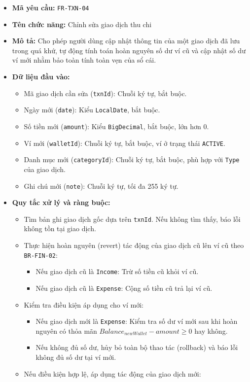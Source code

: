 \documentclass[11pt,a4paper]{article}
\providecommand{\tightlist}{
  \setlength{\itemsep}{0pt}\setlength{\parskip}{0pt}}
\begin{document}
\begin{itemize}
\tightlist
\item
  \textbf{Mã yêu cầu:} \texttt{FR-TXN-04}
\item
  \textbf{Tên chức năng:} Chỉnh sửa giao dịch thu chi
\item
  \textbf{Mô tả:} Cho phép người dùng cập nhật thông tin của một giao
  dịch đã lưu trong quá khứ, tự động tính toán hoàn nguyên số dư ví cũ
  và cập nhật số dư ví mới nhằm bảo toàn tính toàn vẹn của sổ cái.
\item
  \textbf{Dữ liệu đầu vào:}

  \begin{itemize}
  \tightlist
  \item
    Mã giao dịch cần sửa (\texttt{txnId}): Chuỗi ký tự, bắt buộc.
  \item
    Ngày mới (\texttt{date}): Kiểu \texttt{LocalDate}, bắt buộc.
  \item
    Số tiền mới (\texttt{amount}): Kiểu \texttt{BigDecimal}, bắt buộc,
    lớn hơn 0.
  \item
    Ví mới (\texttt{walletId}): Chuỗi ký tự, bắt buộc, ví ở trạng thái
    \texttt{ACTIVE}.
  \item
    Danh mục mới (\texttt{categoryId}): Chuỗi ký tự, bắt buộc, phù hợp
    với \texttt{Type} của giao dịch.
  \item
    Ghi chú mới (\texttt{note}): Chuỗi ký tự, tối đa 255 ký tự.
  \end{itemize}
\item
  \textbf{Quy tắc xử lý và ràng buộc:}

  \begin{itemize}
  \tightlist
  \item
    Tìm bản ghi giao dịch gốc dựa trên \texttt{txnId}. Nếu không tìm
    thấy, báo lỗi không tồn tại giao dịch.
  \item
    Thực hiện hoàn nguyên (revert) tác động của giao dịch cũ lên ví cũ
    theo \texttt{BR-FIN-02}:

    \begin{itemize}
    \tightlist
    \item
      Nếu giao dịch cũ là \texttt{Income}: Trừ số tiền cũ khỏi ví cũ.
    \item
      Nếu giao dịch cũ là \texttt{Expense}: Cộng số tiền cũ trả lại ví
      cũ.
    \end{itemize}
  \item
    Kiểm tra điều kiện áp dụng cho ví mới:

    \begin{itemize}
    \tightlist
    \item
      Nếu giao dịch mới là \texttt{Expense}: Kiểm tra số dư ví mới sau
      khi hoàn nguyên có thỏa mãn \(Balance_{newWallet} - amount \ge 0\)
      hay không.
    \item
      Nếu không đủ số dư, hủy bỏ toàn bộ thao tác (rollback) và báo lỗi
      không đủ số dư tại ví mới.
    \end{itemize}
  \item
    Nếu điều kiện hợp lệ, áp dụng tác động của giao dịch mới:


\end{itemize}
\end{itemize}
\end{document}
